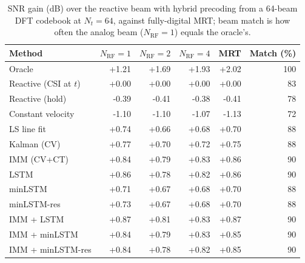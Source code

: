 \begin{table}[t]
\centering
\caption{SNR gain (dB) over the reactive beam with hybrid precoding from a 64-beam DFT codebook at $N_t{=}64$, against fully-digital MRT; beam match is how often the analog beam ($N_{\mathrm{RF}}{=}1$) equals the oracle's.}\label{tab:hybrid64}
\begin{tabular}{lrrrrr}
\toprule
Method & $N_{\mathrm{RF}}{=}1$ & $N_{\mathrm{RF}}{=}2$ & $N_{\mathrm{RF}}{=}4$ & MRT & Match (\%) \\
\midrule
Oracle & +1.21 & +1.69 & +1.93 & +2.02 & 100 \\
Reactive (CSI at $t$) & +0.00 & +0.00 & +0.00 & +0.00 & 83 \\
Reactive (hold) & -0.39 & -0.41 & -0.38 & -0.41 & 78 \\
Constant velocity & -1.10 & -1.10 & -1.07 & -1.13 & 72 \\
LS line fit & +0.74 & +0.66 & +0.68 & +0.70 & 88 \\
Kalman (CV) & +0.77 & +0.70 & +0.72 & +0.75 & 88 \\
IMM (CV+CT) & +0.84 & +0.79 & +0.83 & +0.86 & 90 \\
LSTM & +0.86 & +0.78 & +0.82 & +0.86 & 90 \\
minLSTM & +0.71 & +0.67 & +0.68 & +0.70 & 88 \\
minLSTM-res & +0.73 & +0.67 & +0.68 & +0.70 & 88 \\
IMM + LSTM & +0.87 & +0.81 & +0.83 & +0.87 & 90 \\
IMM + minLSTM & +0.84 & +0.79 & +0.83 & +0.85 & 90 \\
IMM + minLSTM-res & +0.84 & +0.78 & +0.82 & +0.85 & 90 \\
\bottomrule
\end{tabular}
\end{table}
